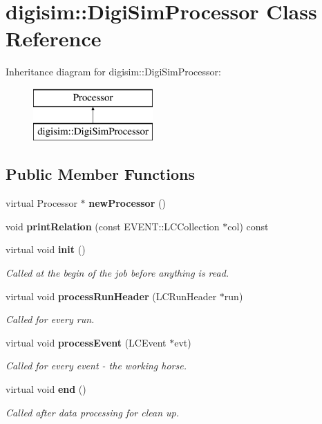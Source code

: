 \section{digisim\-:\-:Digi\-Sim\-Processor Class Reference}
\label{classdigisim_1_1DigiSimProcessor}
Inheritance diagram for digisim\-:\-:Digi\-Sim\-Processor\-:\begin{figure}[H]
\begin{center}
\leavevmode
\includegraphics[height=2.000000cm]{classdigisim_1_1DigiSimProcessor}
\end{center}
\end{figure}
\subsection*{Public Member Functions}
\begin{DoxyCompactItemize}
\item 
virtual Processor $\ast$ {\bfseries new\-Processor} ()\label{classdigisim_1_1DigiSimProcessor_aa222ce6e8d8948c1d1c6dd413d3a0d45}

\item 
void {\bfseries print\-Relation} (const E\-V\-E\-N\-T\-::\-L\-C\-Collection $\ast$col) const \label{classdigisim_1_1DigiSimProcessor_a524cf1b360877b285cbe11775db8b24e}

\item 
virtual void {\bf init} ()
\begin{DoxyCompactList}\small\item\em Called at the begin of the job before anything is read. \end{DoxyCompactList}\item 
virtual void {\bf process\-Run\-Header} (L\-C\-Run\-Header $\ast$run)\label{classdigisim_1_1DigiSimProcessor_afebcfdc5cee837f85b936f1bb2755641}

\begin{DoxyCompactList}\small\item\em Called for every run. \end{DoxyCompactList}\item 
virtual void {\bf process\-Event} (L\-C\-Event $\ast$evt)\label{classdigisim_1_1DigiSimProcessor_a9871ae2646095074aa75eba727d3377a}

\begin{DoxyCompactList}\small\item\em Called for every event -\/ the working horse. \end{DoxyCompactList}\item 
virtual void {\bf end} ()\label{classdigisim_1_1DigiSimProcessor_a2028c0212bdad8abc1359f0a6652d1a4}

\begin{DoxyCompactList}\small\item\em Called after data processing for clean up. \end{DoxyCompactList}\end{DoxyCompactItemize}
